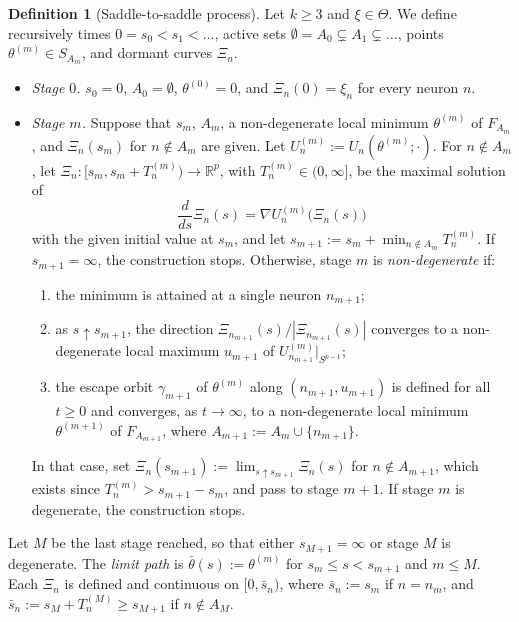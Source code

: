 \documentclass[11pt]{article}
\theoremstyle{definition}
\newtheorem{definition}[theorem]{Definition}
\theoremstyle{remark}
\numberwithin{equation}{section}
\newcommand{\R}{\mathbb{R}}
\begin{document}
\begin{definition}[Saddle-to-saddle process]\label{def:process}
Let $k\ge3$ and $\xi\in\Theta$. We define recursively times $0=s_0<s_1<\dots$, active sets $\emptyset=A_0\subsetneq A_1\subsetneq\dots$, points $\theta^{(m)}\in S_{A_m}$, and dormant curves $\Xi_n$.
\begin{itemize}
\item \emph{Stage $0$.} $s_0=0$, $A_0=\emptyset$, $\theta^{(0)}=0$, and $\Xi_n(0)=\xi_n$ for every neuron $n$.
\item \emph{Stage $m$.} Suppose that $s_m$, $A_m$, a non-degenerate local minimum $\theta^{(m)}$ of $F_{A_m}$, and $\Xi_n(s_m)$ for $n\notin A_m$ are given. Let $U_n^{(m)}:=U_n(\theta^{(m)};\cdot)$. For $n\notin A_m$, let $\Xi_n\colon[s_m,s_m+T_n^{(m)})\to\R^p$, with $T_n^{(m)}\in(0,\infty]$, be the maximal solution of
\begin{equation}\label{eq:dormant}
\frac{d}{ds}\Xi_n(s)=\nabla U_n^{(m)}\big(\Xi_n(s)\big)
\end{equation}
with the given initial value at $s_m$, and let $s_{m+1}:=s_m+\min_{n\notin A_m}T_n^{(m)}$. If $s_{m+1}=\infty$, the construction stops. Otherwise, stage $m$ is \emph{non-degenerate} if:
\begin{enumerate}[label=\textup{(ND\arabic*)},leftmargin=4em]
\item the minimum is attained at a single neuron $n_{m+1}$;
\item as $s\uparrow s_{m+1}$, the direction $\Xi_{n_{m+1}}(s)/|\Xi_{n_{m+1}}(s)|$ converges to a non-degenerate local maximum $u_{m+1}$ of $U^{(m)}_{n_{m+1}}|_{S^{p-1}}$;
\item the escape orbit $\gamma_{m+1}$ of $\theta^{(m)}$ along $(n_{m+1},u_{m+1})$ is defined for all $t\ge0$ and converges, as $t\to\infty$, to a non-degenerate local minimum $\theta^{(m+1)}$ of $F_{A_{m+1}}$, where $A_{m+1}:=A_m\cup\{n_{m+1}\}$.
\end{enumerate}
In that case, set $\Xi_n(s_{m+1}):=\lim_{s\uparrow s_{m+1}}\Xi_n(s)$ for $n\notin A_{m+1}$, which exists since $T^{(m)}_n>s_{m+1}-s_m$, and pass to stage $m+1$. If stage $m$ is degenerate, the construction stops.
\end{itemize}
Let $M$ be the last stage reached, so that either $s_{M+1}=\infty$ or stage $M$ is degenerate. The \emph{limit path} is $\bar\theta(s):=\theta^{(m)}$ for $s_m\le s<s_{m+1}$ and $m\le M$. Each $\Xi_n$ is defined and continuous on $[0,\bar s_n)$, where $\bar s_n:=s_m$ if $n=n_m$, and $\bar s_n:=s_M+T^{(M)}_n\ge s_{M+1}$ if $n\notin A_M$.
\end{definition}
\end{document}
